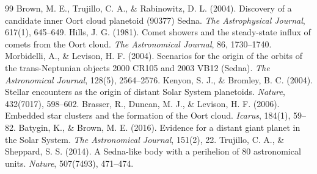 \documentclass[11pt,a4paper]{article}
\begin{document}
\begin{thebibliography}{99}
 Brown, M. E., Trujillo, C. A., \& Rabinowitz, D. L. (2004). Discovery of a candidate inner Oort cloud planetoid (90377) Sedna. \textit{The Astrophysical Journal}, 617(1), 645--649.
 Hills, J. G. (1981). Comet showers and the steady-state influx of comets from the Oort cloud. \textit{The Astronomical Journal}, 86, 1730--1740.
 Morbidelli, A., \& Levison, H. F. (2004). Scenarios for the origin of the orbits of the trans-Neptunian objects 2000 CR105 and 2003 VB12 (Sedna). \textit{The Astronomical Journal}, 128(5), 2564--2576.
 Kenyon, S. J., \& Bromley, B. C. (2004). Stellar encounters as the origin of distant Solar System planetoids. \textit{Nature}, 432(7017), 598--602.
 Brasser, R., Duncan, M. J., \& Levison, H. F. (2006). Embedded star clusters and the formation of the Oort cloud. \textit{Icarus}, 184(1), 59--82.
 Batygin, K., \& Brown, M. E. (2016). Evidence for a distant giant planet in the Solar System. \textit{The Astronomical Journal}, 151(2), 22.
 Trujillo, C. A., \& Sheppard, S. S. (2014). A Sedna-like body with a perihelion of 80 astronomical units. \textit{Nature}, 507(7493), 471--474.
\end{thebibliography}
\end{document}
